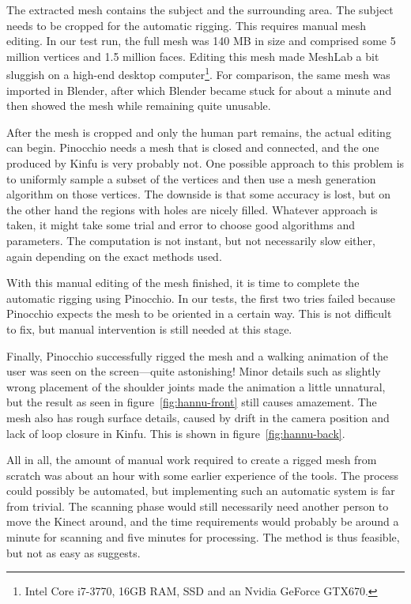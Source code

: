 The extracted mesh contains the subject and the surrounding area. The subject needs to be cropped for the automatic rigging. This requires manual mesh editing. In our test run, the full mesh was 140 MB in size and comprised some 5 million vertices and 1.5 million faces. Editing this mesh made MeshLab a bit sluggish on a high-end desktop computer\footnote{Intel Core i7-3770, 16GB RAM, SSD and an Nvidia GeForce GTX670.}. For comparison, the same mesh was imported in Blender, after which Blender became stuck for about a minute and then showed the mesh while remaining quite unusable.

After the mesh is cropped and only the human part remains, the actual editing can begin. Pinocchio needs a mesh that is closed and connected, and the one produced by Kinfu is very probably not. One possible approach to this problem is to uniformly sample a subset of the vertices and then use a mesh generation algorithm on those vertices. The downside is that some accuracy is lost, but on the other hand the regions with holes are nicely filled. Whatever approach is taken, it might take some trial and error to choose good algorithms and parameters. The computation is not instant, but not necessarily slow either, again depending on the exact methods used.

With this manual editing of the mesh finished, it is time to complete the automatic rigging using Pinocchio. In our tests, the first two tries failed because Pinocchio expects the mesh to be oriented in a certain way. This is not difficult to fix, but manual intervention is still needed at this stage.

Finally, Pinocchio successfully rigged the mesh and a walking animation of the user was seen on the screen---quite astonishing! Minor details such as slightly wrong placement of the shoulder joints made the animation a little unnatural, but the result as seen in figure~\ref{fig:hannu-front} still causes amazement. The mesh also has rough surface details, caused by drift in the camera position and lack of loop closure in Kinfu. This is shown in figure~\ref{fig:hannu-back}.

All in all, the amount of manual work required to create a rigged mesh from scratch was about an hour with some earlier experience of the tools. The process could possibly be automated, but implementing such an automatic system is far from trivial. The scanning phase would still necessarily need another person to move the Kinect around, and the time requirements would probably be around a minute for scanning and five minutes for processing. The method is thus feasible, but not as easy as \citet{charpentier2011accurate} suggests.

